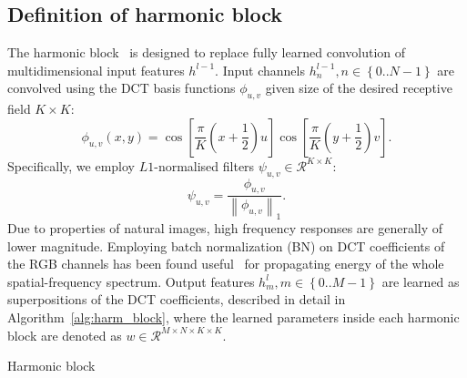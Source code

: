\documentclass[conference]{IEEEtran}
\begin{document}
\subsection{Definition of harmonic block} \label{sec:trans/harm_block}
The harmonic block~\cite{Ulicny18} is designed to replace fully learned convolution of multidimensional input features $h^{l-1}$. Input channels $h_n^{l-1}, n \in \left\{ 0..N-1 \right\}$ are convolved using the DCT basis functions $\phi_{u,v}$ given size of the desired receptive field $K \times K$:
\begin{equation} \label{eq:dct_filt}
\phi_{u,v}\left(x,y\right) = \cos{\left[\frac{\pi}{K} \left(x+\frac{1}{2}\right)u\right]} \cos{\left[\frac{\pi}{K} \left(y+\frac{1}{2}\right)v\right]}.
\end{equation}
Specifically, we employ $L1$-normalised filters $\psi_{u,v}\in \mathcal{R}^{K \times K}$:
\begin{equation}
    \psi_{u,v} = \frac{\phi_{u,v}}{\left\lVert \phi_{u,v} \right\rVert_1}.
\end{equation}
Due to properties of natural images, high frequency responses are generally of lower magnitude. Employing batch normalization (BN) on DCT coefficients of the RGB channels has been found useful~\cite{Ulicny18} for propagating energy of the whole spatial-frequency spectrum. Output features $h_m^l, m \in \left\{ 0..M-1 \right\}$ are learned as superpositions of the DCT coefficients, described in detail in Algorithm~\ref{alg:harm_block}, where the learned parameters inside each harmonic block are denoted as $w \in \mathcal{R}^{M \times N \times K \times K}$.

\begin{algorithm}[!b]
\caption{Harmonic block}\label{alg:harm_block}
\end{algorithm}
\end{document}
